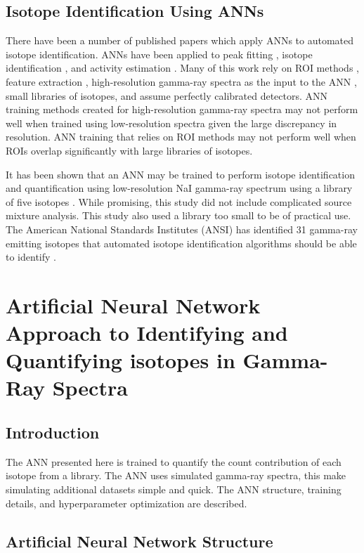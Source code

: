 \documentclass[thesis,tocnosub,noragright,centerchapter,12pt,fullpage]{uiucecethesis09}
\begin{document}
\section{Isotope Identification Using ANNs}

There have been a number of published papers which apply ANNs to automated isotope identification. ANNs have been applied to peak fitting \cite{Abdel-Aal2002}, isotope identification \cite{Abdel-Aal1996, Medhat2012}, and activity estimation \cite{Abdel-Aal1996, Vigneron1996}. Many of this work rely on ROI methods \cite{Pilato1999}, feature extraction \cite{Chen2009}, high-resolution gamma-ray spectra as the input to the ANN \cite{Yoshida2002}, small libraries of isotopes, and assume perfectly calibrated detectors. ANN training methods created for high-resolution gamma-ray spectra may not perform well when trained using low-resolution spectra given the large discrepancy in resolution. ANN training that relies on ROI methods may not perform well when ROIs overlap significantly with large libraries of isotopes.

It has been shown that an ANN may be trained to perform isotope identification and quantification using low-resolution NaI gamma-ray spectrum using a library of five isotopes \cite{Olmos1991}. While promising, this study did not include complicated source mixture analysis. This study also used a library too small to be of practical use. The American National Standards Institutes (ANSI) has identified 31 gamma-ray emitting isotopes that automated isotope identification algorithms should be able to identify \cite{ANSI}.


\chapter{Artificial Neural Network Approach to Identifying and Quantifying isotopes in Gamma-Ray Spectra}


\section{Introduction}

The ANN presented here is trained to quantify the count contribution of each isotope from a library. The ANN uses simulated gamma-ray spectra, this make simulating additional datasets simple and quick. The ANN structure, training details, and hyperparameter optimization are described. 


\section{Artificial Neural Network Structure}
\end{document}
